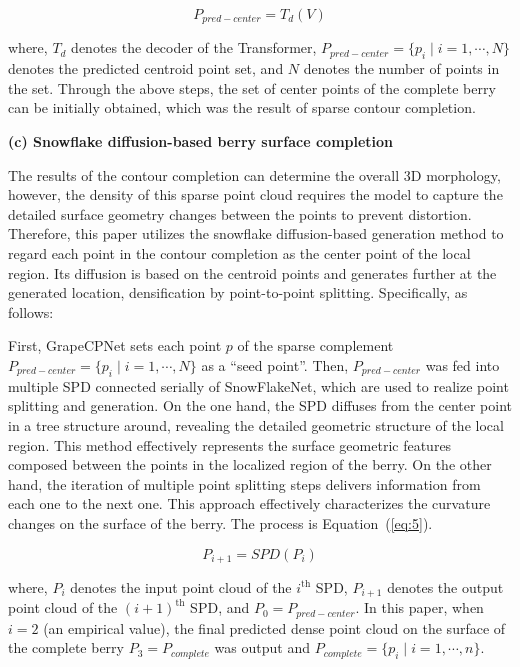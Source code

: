 \documentclass[12pt]{article}
\begin{document}
\begin{equation}
    P_{pred-center} = T_d(V)
    \label{eq:4}
\end{equation}

{\raggedright where, $T_d$ denotes the decoder of the Transformer, $P_{pred-center}=\{p_i \mid i=1,\cdots,N\}$ denotes the predicted centroid point set, and $N$ denotes the number of points in the set. 
Through the above steps, the set of center points of the complete berry can be initially obtained, which was the result of sparse contour completion.}

{\raggedright\textbf{(c) Snowflake diffusion-based berry surface completion}}

The results of the contour completion can determine the overall 3D morphology, however, the density of this sparse point cloud requires the model to capture the detailed surface geometry changes between the points to prevent distortion. 
Therefore, this paper utilizes the snowflake diffusion-based generation method to regard each point in the contour completion as the center point of the local region. 
Its diffusion is based on the centroid points and generates further at the generated location, densification by point-to-point splitting. 
Specifically, as follows:

First, GrapeCPNet sets each point $p$ of the sparse complement $P_{pred-center}=\{p_i \mid i=1,\cdots,N\}$ as a ``seed point''. 
Then, $P_{pred-center}$ was fed into multiple SPD \citep{xiang_snowflakenet_2021} connected serially of SnowFlakeNet, which are used to realize point splitting and generation. 
On the one hand, the SPD diffuses from the center point in a tree structure around, revealing the detailed geometric structure of the local region. 
This method effectively represents the surface geometric features composed between the points in the localized region of the berry. 
On the other hand, the iteration of multiple point splitting steps delivers information from each one to the next one. 
This approach effectively characterizes the curvature changes on the surface of the berry. The process is Equation~(\ref{eq:5}).

\begin{equation}
    P_{i+1} = SPD(P_i)
    \label{eq:5}
\end{equation}

{\raggedright where, $P_i$ denotes the input point cloud of the $i^{\text{th}}$ SPD, $P_{i+1}$ denotes the output point cloud of the $(i+1)^{\text{th}}$ SPD, and $P_0=P_{pred-center}$. 
In this paper, when $i=2$ (an empirical value), the final predicted dense point cloud on the surface of the complete berry $P_3=P_{complete}$ was output and $P_{complete}=\{p_i \mid i=1,\cdots,n\}$.}
\end{document}
